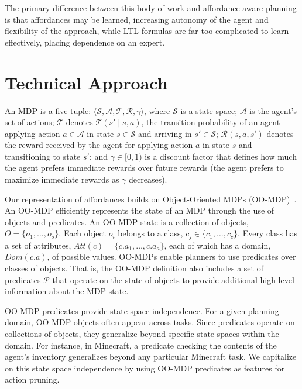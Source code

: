 \documentclass[letterpaper]{article}
\begin{document}
The primary difference between this body of work and affordance-aware planning is that
affordances may be learned, increasing autonomy of the agent and flexibility of the approach, while LTL formulas are far
too complicated to learn effectively, placing dependence on an expert.

\section{Technical Approach}
\label{sec:affordances}

An MDP is a five-tuple: $\langle \mathcal{S}, \mathcal{A},
\mathcal{T}, \mathcal{R}, \gamma \rangle$, where $\mathcal{S}$ is a
state space; $\mathcal{A}$ is the agent's set of actions;
$\mathcal{T}$ denotes $\mathcal{T}(s' \mid s,a)$, the transition
probability of an agent applying action $a \in \mathcal{A}$ in state
$s \in \mathcal{S}$ and arriving in $s' \in \mathcal{S}$;
$\mathcal{R}(s,a,s')$ denotes the reward received by the agent for
applying action $a$ in state $s$ and transitioning to state $s'$;
and $\gamma \in [0, 1)$ is a discount factor that defines how much the
agent prefers immediate rewards over future rewards (the agent
prefers to maximize immediate rewards as $\gamma$ decreases).

Our representation of affordances builds on Object-Oriented MDPs
(OO-MDP)~\citep{diuk08}.  An OO-MDP efficiently represents the state
of an MDP through the use of objects and predicates.  An OO-MDP state
is a collection of objects, $O = \{o_1, \ldots, o_o \}$.  Each object
$o_i$ belongs to a class, $c_j \in \{c_1, \ldots, c_c\}$. Every class
has a set of attributes, $Att(c) = \{c.a_1, \ldots, c.a_a \}$, each of
which has a domain, $Dom(c.a)$, of possible values. OO-MDPs enable
planners to use predicates over classes of objects. That is, the
OO-MDP definition also includes a set of predicates $\mathcal{P}$ that
operate on the state of objects to provide additional high-level
information about the MDP state.

OO-MDP predicates provide state space independence. For a given planning domain, OO-MDP objects
often appear across tasks. Since predicates operate on collections
of objects, they generalize beyond specific state spaces within the domain.
For instance, in Minecraft, a predicate checking the contents of the agent's inventory
generalizes beyond any particular Minecraft task. We capitalize on this state space
independence by using OO-MDP predicates as features for action pruning.
\end{document}
